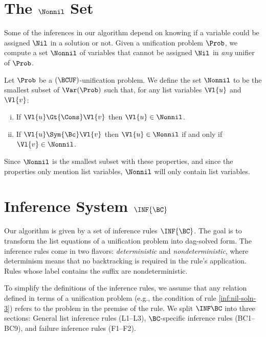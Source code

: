 \section{The $\Nonnil$ Set}

Some of the inferences in our algorithm depend on knowing if a variable could
be assigned $\Nil$ in a solution or not. Given a unification problem $\Prob$,
we compute a set $\Nonnil$ of variables that cannot be assigned $\Nil$ in
\emph{any} unifier of $\Prob$.

\begin{Definition}
    Let $\Prob$ be a $(\BCUF)$-unification problem. We define the set $\Nonnil$
    to be the smallest subset of $\Var(\Prob)$ such that, for any list variables
    $\Vl{u}$ and $\Vl{v}$:
    \begin{enumerate}[(i)]
        \item If $\Vl{u} \Gt{\Cons} \Vl{v}$ then $\Vl{u} \in \Nonnil$.
        \item If $\Vl{u} \Sym{\Bc} \Vl{v}$ then $\Vl{u} \in \Nonnil$ if and only
            if $\Vl{v} \in \Nonnil$.
    \end{enumerate}

    Since $\Nonnil$ is the smallest subset with these properties, and since the
    properties only mention list variables, $\Nonnil$ will only contain list
    variables.
\end{Definition}

\section{Inference System $\INF{\BC}$}\label{sec:inf-bc}

Our algorithm is given by a set of inference rules $\INF{\BC}$. The goal is to
transform the list equations of a unification problem into dag-solved form. The
inference rules come in two flavors: \emph{deterministic} and
\emph{nondeterministic}, where determinism means that no backtracking is
required in the rule's application. Rules whose label contains the
 suffix are nondeterministic.

To simplify the definitions of the inference rules, we assume that any relation
defined in terms of a unification problem (e.g., the condition of rule
\ref{inf:nil-soln-3}) refers to the problem in the premise of the rule. We
split $\INF\BC$ into three sections: General list inference rules (L1--L3),
$\BC$-specific inference rules (BC1--BC9), and failure inference rules
(F1--F2).

